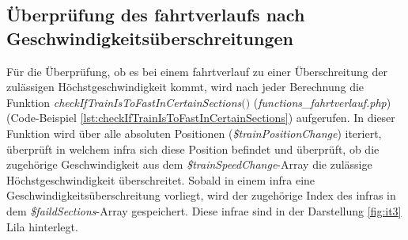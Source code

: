 \subsection{Überprüfung des \Gls{fahrtverlauf}s nach Geschwindigkeitsüberschreitungen} \label{überprüfung}
Für die Überprüfung, ob es bei einem \Gls{fahrtverlauf} zu einer Überschreitung der zulässigen Höchstgeschwindigkeit kommt, wird nach jeder Berechnung die Funktion \textit{check\-If\-Train\-Is\-To\-Fast\-In\-Certain\-Sec\-tions$($$)$} (\textit{functions\_fahrtverlauf.php}) (Code-Beispiel \ref{lst:checkIfTrainIsToFastInCertainSections}) aufgerufen. In dieser Funktion wird über alle absoluten Positionen (\textit{\$trainPositionChange}) iteriert, überprüft in welchem \ac{infra} sich diese Position befindet und überprüft, ob die zugehörige Geschwindigkeit aus dem \textit{\$trainSpeedChange}-Array die zulässige Höchstgeschwindigkeit überschreitet. Sobald in einem \ac{infra} eine Geschwindigkeitsüberschreitung vorliegt, wird der zugehörige Index des \ac{infra}s in dem \textit{\$faildSections}-Array gespeichert. Diese \ac{infra}e sind in der Darstellung \ref{fig:it3} Lila hinterlegt. 

